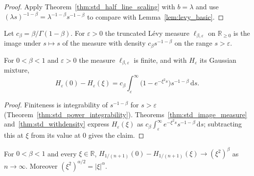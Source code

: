 \begin{proof}
\leanok
Apply Theorem~\ref{thm:std_half_line_scaling} with $b = \lambda$ and use $(\lambda s)^{-1-\beta} = \lambda^{-1-\beta} s^{-1-\beta}$ to compare with Lemma~\ref{lem:levy_basic}.
\end{proof}

\begin{definition}\label{def:levy_measure}
\leanok
Let $c_\beta = \beta / \Gamma(1 - \beta)$. For $\varepsilon > 0$ the truncated Lévy measure $\ell_{\beta, \varepsilon}$ on $\mathbb{R}_{\ge 0}$ is the image under $s \mapsto s$ of the measure with density $c_\beta s^{-1-\beta}$ on the range $s > \varepsilon$.
\end{definition}

\begin{lemma}\label{lem:levy_measure_mixture}
\leanok
For $0 < \beta < 1$ and $\varepsilon > 0$ the measure $\ell_{\beta, \varepsilon}$ is finite, and with $H_\varepsilon$ its Gaussian mixture,
\[
  H_\varepsilon(0) - H_\varepsilon(\xi) = c_\beta \int_\varepsilon^\infty \bigl(1 - e^{-\xi^2 s}\bigr) s^{-1-\beta}\, \mathrm{d}s.
\]
\end{lemma}

\begin{proof}
\leanok
Finiteness is integrability of $s^{-1-\beta}$ for $s > \varepsilon$ (Theorem~\ref{thm:std_power_integrability}). Theorems~\ref{thm:std_image_measure} and~\ref{thm:std_withdensity} express $H_\varepsilon(\xi)$ as $c_\beta \int_\varepsilon^\infty e^{-\xi^2 s} s^{-1-\beta}\, \mathrm{d}s$; subtracting this at $\xi$ from its value at $0$ gives the claim.
\end{proof}

\begin{theorem}\label{thm:levy_limit}
\leanok
For $0 < \beta < 1$ and every $\xi \in \mathbb{R}$, $H_{1/(n+1)}(0) - H_{1/(n+1)}(\xi) \to (\xi^2)^\beta$ as $n \to \infty$. Moreover $(\xi^2)^{\alpha/2} = \lvert \xi \rvert^\alpha$.
\end{theorem}

